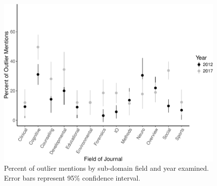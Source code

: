 \documentclass[english,,man]{apa6}
\begin{document}
\begin{figure}
\centering
\includegraphics{outliers_manuscript_files/figure-latex/type-graph-1.pdf}
\caption{\label{fig:type-graph}Percent of outlier mentions by sub-domain field and year examined. Error bars represent 95\% confidence interval.}
\end{figure}
\end{document}
